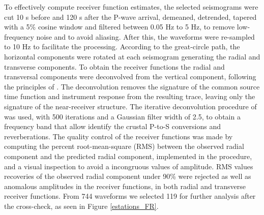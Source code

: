 \documentclass[paper,11pt]{geophysics}
\begin{document}
To effectively compute receiver function estimates, the selected seismograms were cut 10 s before and 120 s after the P-wave arrival, demeaned, detrended, tapered with a 5\% cosine window and filtered between 0.05 Hz to 5 Hz, to remove low-frequency noise and to avoid aliasing. After this, the waveforms were re-sampled to 10 Hz to facilitate the processing. According to the great-circle path, the horizontal components were rotated at each seismogram generating the radial and transverse components. To obtain the receiver functions the radial and transversal components were deconvolved from the vertical component, following the principles of \cite{langston_structure_1979}. The deconvolution removes the signature of the common source time function and instrument response from the resulting trace, leaving only the signature of the near-receiver structure. The iterative deconvolution procedure of \cite{ligorria_iterative_1999} was used, with 500 iterations and a Gaussian filter width of 2.5, to obtain a frequency band that allow identify the crustal P-to-S conversions and reverberations. The quality control of the receiver functions was made by computing the percent root-mean-square (RMS) between the observed radial component and the predicted radial component, implemented in the \cite{ligorria_iterative_1999} procedure, and  a visual inspection to avoid a incongruous values of amplitude. RMS values recoveries of the observed radial component under 90\% were rejected as well as anomalous amplitudes in the receiver functions, in both radial and transverse receiver functions. From 744 waveforms we selected 119  for further analysis after the cross-check, as seen in Figure \ref{estations_FR}.
\end{document}
